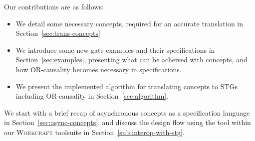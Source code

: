 \documentclass[british, journal]{IEEEtran}
\newcommand{\noun}[1]{\textsc{#1}}
\begin{document}
Our contributions are as follows:
\begin{itemize}
  \item We detail some necessary concepts, required for an accurate 
  translation in Section~\ref{sec:trans-concepts}
  \item We introduce some new gate examples and their specifications in
  Section~\ref{sec:examples}, presenting what can be acheived with
  concepts, and how OR-causality becomes necessary in specifications.
  \item We present the implemented algorithm for translating concepts to STGs
  including OR-causality in Section~\ref{sec:algorithm}.
\end{itemize}

\noindent
We start with a brief recap of asynchronous concepts as a specification language in
Section~\ref{sec:async-concepts}, and discuss the design flow using the tool within our
\noun{Workcraft} toolsuite in Section~\ref{sub:interop-with-stg}.

\end{document}
